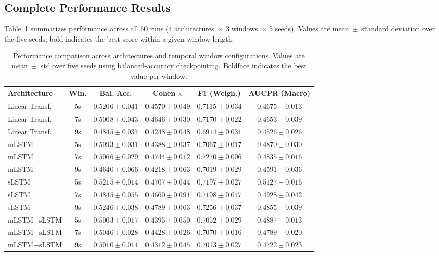 \subsection{Complete Performance Results}

Table~\ref{tab:metrics_comparison} summarizes performance across all 60 runs (4
architectures~\(\times\) 3 windows~\(\times\) 5 seeds). Values are
mean~\(\pm\)~standard deviation over the five seeds; bold indicates the best
score within a given window length.

\begin{table}[htbp]
\centering
\caption{Performance comparison across architectures and temporal window
configurations. Values are mean~\(\pm\)~std over five seeds using
balanced-accuracy checkpointing. Boldface indicates the best value per window.}
\label{tab:metrics_comparison}
\footnotesize
\begin{tabular}{l | c | c | c | c | c}
\textbf{Architecture} & \textbf{Win.} & \textbf{Bal. Acc.} & \textbf{Cohen \(\kappa\)} & \textbf{F1 (Weigh.)} & \textbf{AUCPR (Macro)} \\
\hline
Linear Transf. & 5s & $0.5206 \pm 0.041$ & $0.4570 \pm 0.049$ & $0.7115 \pm 0.034$ & $0.4675 \pm 0.013$ \\
Linear Transf. & 7s & $0.5008 \pm 0.043$ & $0.4646 \pm 0.030$ & $0.7170 \pm 0.022$ & $0.4653 \pm 0.039$ \\
Linear Transf. & 9s & $0.4845 \pm 0.037$ & $0.4248 \pm 0.048$ & $0.6914 \pm 0.031$ & $0.4526 \pm 0.026$ \\
\hline
\ac{mLSTM} & 5s & $0.5093 \pm 0.031$ & $0.4388 \pm 0.037$ & $0.7067 \pm 0.017$ & $0.4870 \pm 0.030$ \\
\ac{mLSTM} & 7s & $\mathbf{0.5066 \pm 0.029}$ & $\mathbf{0.4744 \pm 0.012}$ & $\mathbf{0.7270 \pm 0.006}$ & $0.4835 \pm 0.016$ \\
\ac{mLSTM} & 9s & $0.4640 \pm 0.066$ & $0.4218 \pm 0.063$ & $0.7019 \pm 0.029$ & $0.4591 \pm 0.036$ \\
\hline
\ac{sLSTM} & 5s & $\mathbf{0.5215 \pm 0.014}$ & $\mathbf{0.4707 \pm 0.044}$ & $\mathbf{0.7197 \pm 0.027}$ & $\mathbf{0.5127 \pm 0.016}$ \\
\ac{sLSTM} & 7s & $0.4845 \pm 0.055$ & $0.4660 \pm 0.091$ & $\mathbf{0.7198 \pm 0.047}$ & $\mathbf{0.4928 \pm 0.042}$ \\
\ac{sLSTM} & 9s & $\mathbf{0.5246 \pm 0.038}$ & $\mathbf{0.4789 \pm 0.063}$ & $\mathbf{0.7256 \pm 0.037}$ & $\mathbf{0.4855 \pm 0.039}$ \\
\hline
\ac{mLSTM}+\ac{sLSTM} & 5s & $0.5003 \pm 0.017$ & $0.4395 \pm 0.050$ & $0.7052 \pm 0.029$ & $0.4887 \pm 0.013$ \\
\ac{mLSTM}+\ac{sLSTM} & 7s & $0.5046 \pm 0.028$ & $0.4428 \pm 0.026$ & $0.7070 \pm 0.016$ & $0.4789 \pm 0.020$ \\
\ac{mLSTM}+\ac{sLSTM} & 9s & $0.5010 \pm 0.011$ & $0.4312 \pm 0.045$ & $0.7013 \pm 0.027$ & $0.4722 \pm 0.023$ \\
\hline
\end{tabular}
\end{table}

